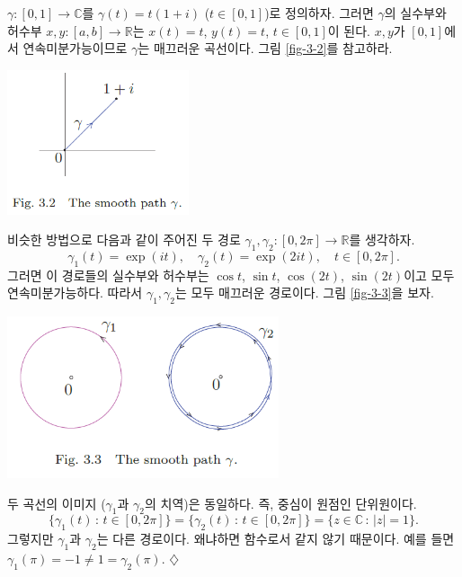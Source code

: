 \begin{saltexample}[label=example-3-1]{}{}
$\gamma : [0,1] \to \mathbb C$를 
$\gamma(t) = t(1+i)$ ($t\in[0,1]$)로 정의하자.
그러면 $\gamma$의 실수부와 허수부  $x,y: [a,b] \to \mathbb R$는
$x(t)=t$, $y(t)=t$, $t\in [0,1]$이 된다.
$x, y$가 $[0,1]$에서 연속미분가능이므로 $\gamma$는 매끄러운 곡선이다.
그림 \ref{fig-3-2}를 참고하라.
\begin{center}
\includegraphics[width=0.4\textwidth]{./SaltChapter/fig-3-2}
\end{center}
\label{fig-3-2}
비슷한 방법으로 다음과 같이 주어진 두 경로  $\gamma_1, \gamma_2: [0,2\pi] \to \mathbb R$를
생각하자.
\[
\gamma_1(t) = \exp(it), \quad \gamma_2(t) = \exp(2it), \quad t\in [0,2\pi].
\]
그러면 이 경로들의 실수부와 허수부는
$\cos t$, $\sin t$, $\cos(2t)$, $\sin(2t)$이고
모두 연속미분가능하다.
따라서 $\gamma_1, \gamma_2$는 모두 매끄러운 경로이다.
그림 \ref{fig-3-3}을 보자.
\begin{center}
\includegraphics[width=0.6\textwidth]{./SaltChapter/fig-3-3}
\end{center}
\label{fig-3-3}
두 곡선의 이미지 ($\gamma_1$과 $\gamma_2$의 치역)은 동일하다.
즉, 중심이 원점인 단위원이다.
\[
\{\gamma_1(t) \,:\, t\in[0,2\pi]\}  
= \{\gamma_2(t) \,:\, t\in[0,2\pi]\}  
= \{z\in\mathbb C \,:\, |z|=1 \}. 
\] 
그렇지만 $\gamma_1$과 $\gamma_2$는 다른 경로이다.
왜냐하면 함수로서 같지 않기 때문이다. 예를 들면
$\gamma_1(\pi) = -1 \ne 1 = \gamma_2(\pi)$.
\hfill $\diamondsuit$
\end{saltexample}

